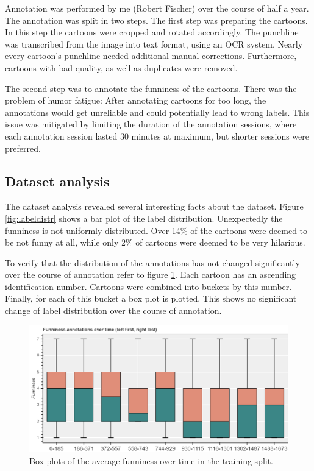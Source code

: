 \documentclass[draft,final,oneside]{vutinfth} %
\begin{document}
Annotation was performed by me (Robert Fischer) over the course of half a year. The annotation was split in two steps. The first step was preparing the cartoons. In this step the cartoons were cropped and rotated accordingly. The punchline was transcribed from the image into text format, using an OCR system. Nearly every cartoon's punchline needed additional manual corrections. Furthermore, cartoons with bad quality, as well as duplicates were removed.

The second step was to annotate the funniness of the cartoons. There was the problem of humor fatigue: After annotating cartoons for too long, the annotations would get unreliable and could potentially lead to wrong labels. This issue was mitigated by limiting the duration of the annotation sessions, where each annotation session lasted 30 minutes at maximum, but shorter sessions were preferred. 

\subsection{Dataset analysis}

The dataset analysis revealed several interesting facts about the dataset. Figure \ref{fig:labeldistr} shows a bar plot of the label distribution. Unexpectedly the funniness is not uniformly distributed. Over 14\% of the cartoons were deemed to be not funny at all, while only 2\% of cartoons were deemed to be very hilarious.

To verify that the distribution of the annotations has not changed significantly over the course of annotation refer to figure \ref{fig:boxplottime}. Each cartoon has an ascending identification number. Cartoons were  combined into buckets by this number. Finally, for each of this bucket a box plot is plotted. This shows no significant change of label distribution over the course of annotation.

\begin{figure}
	\centering
  	\includegraphics[width=1.0\textwidth]{graphics/average_funniness_over_time}
	\caption{Box plots of the average funniness over time in the training split.}
	\label{fig:boxplottime}
\end{figure}
\end{document}
